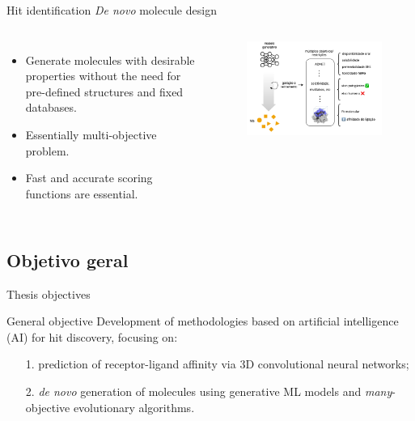 \documentclass[aspectratio=169,xcolor=dvipsnames]{beamer}
\begin{document}
\begin{frame}{Hit identification \hfill \textit{De novo} molecule design}
    \begin{columns}[c]
        \begin{itemize}
            \item Generate molecules with desirable properties without the need for pre-defined structures and fixed databases.
            \item Essentially multi-objective problem.
            \item \alert{Fast and accurate scoring functions are essential.}
        \end{itemize}

        \begin{figure}
            \centering
            \includegraphics[width=.99\linewidth]{imgs/desenho-denovo.png}
        \end{figure}

    \end{columns}
\end{frame}


\subsection{Objetivo geral}


\begin{frame}{Thesis objectives}
    \begin{block}{General objective}
        Development of methodologies based on artificial intelligence (AI) for hit discovery, focusing on:
        \begin{itemize}
            \item[1.] prediction of receptor-ligand affinity via 3D convolutional neural networks;
            \item[2.] \textit{de novo} generation of molecules using generative ML models and \textit{many}-objective evolutionary algorithms.
        \end{itemize}
    \end{block}
\end{frame}
\end{document}
